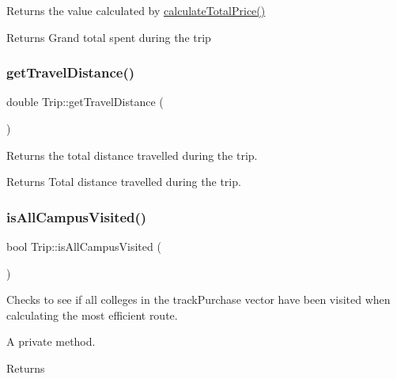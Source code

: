 Returns the value calculated by \hyperlink{class_trip_aff64975175eb1a0c55d408ea5521e092}{calculate\+Total\+Price()} 

\begin{DoxyReturn}{Returns}
Grand total spent during the trip 
\end{DoxyReturn}
\mbox{\label{class_trip_aafe225b87fdabb218e1ef62ec2554310}} 
\subsubsection{\texorpdfstring{get\+Travel\+Distance()}{getTravelDistance()}}
{\footnotesize\ttfamily double Trip\+::get\+Travel\+Distance (\begin{DoxyParamCaption}{ }\end{DoxyParamCaption})}



Returns the total distance travelled during the trip. 

\begin{DoxyReturn}{Returns}
Total distance travelled during the trip. 
\end{DoxyReturn}
\mbox{\label{class_trip_adbcef3d2967bde8ee8439ca2664e5559}} 
\subsubsection{\texorpdfstring{is\+All\+Campus\+Visited()}{isAllCampusVisited()}}
{\footnotesize\ttfamily bool Trip\+::is\+All\+Campus\+Visited (\begin{DoxyParamCaption}{ }\end{DoxyParamCaption})\hspace{0.3cm}{\ttfamily [private]}}



Checks to see if all colleges in the track\+Purchase vector have been visited when calculating the most efficient route. 

A private method.

\begin{DoxyReturn}{Returns}

\end{DoxyReturn}
\mbox{\label{class_trip_a9ab6ed89354dcf98f5207e5213328826}} 
